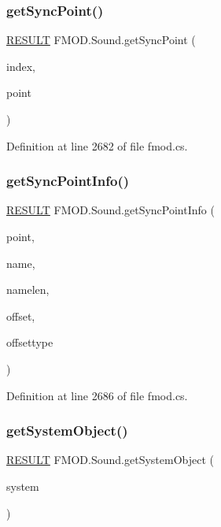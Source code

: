 \subsubsection{\texorpdfstring{get\+Sync\+Point()}{getSyncPoint()}}
{\footnotesize\ttfamily \hyperlink{namespace_f_m_o_d_a305d1176ef3f8c8815861a60407ac33d}{R\+E\+S\+U\+LT} F\+M\+O\+D.\+Sound.\+get\+Sync\+Point (\begin{DoxyParamCaption}\item[{int}]{index,  }\item[{out Int\+Ptr}]{point }\end{DoxyParamCaption})}



Definition at line 2682 of file fmod.\+cs.

\mbox{\label{class_f_m_o_d_1_1_sound_a0e37bd556d8b73fae8aec254cd0deeca}} 
\subsubsection{\texorpdfstring{get\+Sync\+Point\+Info()}{getSyncPointInfo()}}
{\footnotesize\ttfamily \hyperlink{namespace_f_m_o_d_a305d1176ef3f8c8815861a60407ac33d}{R\+E\+S\+U\+LT} F\+M\+O\+D.\+Sound.\+get\+Sync\+Point\+Info (\begin{DoxyParamCaption}\item[{Int\+Ptr}]{point,  }\item[{String\+Builder}]{name,  }\item[{int}]{namelen,  }\item[{out uint}]{offset,  }\item[{\hyperlink{namespace_f_m_o_d_aff20975332f93ff2180d2681cb43929f}{T\+I\+M\+E\+U\+N\+IT}}]{offsettype }\end{DoxyParamCaption})}



Definition at line 2686 of file fmod.\+cs.

\mbox{\label{class_f_m_o_d_1_1_sound_a03c701a8cf017444f7fa3c83c2270dc6}} 
\subsubsection{\texorpdfstring{get\+System\+Object()}{getSystemObject()}}
{\footnotesize\ttfamily \hyperlink{namespace_f_m_o_d_a305d1176ef3f8c8815861a60407ac33d}{R\+E\+S\+U\+LT} F\+M\+O\+D.\+Sound.\+get\+System\+Object (\begin{DoxyParamCaption}\item[{out \hyperlink{class_f_m_o_d_1_1_system}{System}}]{system }\end{DoxyParamCaption})}




